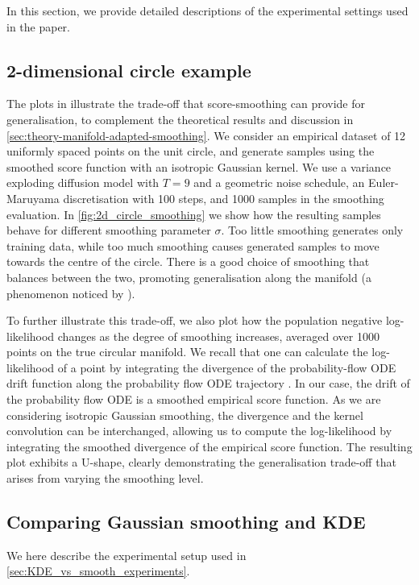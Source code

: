 \documentclass[10pt]{article}
\theoremstyle{plain}
\theoremstyle{definition}
\theoremstyle{remark}
\begin{document}
In this section, we provide detailed descriptions of the experimental settings used in the paper.

\subsection{2-dimensional circle example}\label{app:circle_details}

The plots in  illustrate the trade-off that score-smoothing can provide for generalisation, to complement the theoretical results and discussion in \cref{sec:theory-manifold-adapted-smoothing}. We consider an empirical dataset of 12 uniformly spaced points on the unit circle, and generate samples using the smoothed score function with an isotropic Gaussian kernel. We use a variance exploding diffusion model with $T=9$ and a geometric noise schedule, an Euler-Maruyama discretisation with 100 steps, and 1000 samples in the smoothing evaluation. In \cref{fig:2d_circle_smoothing} we show how the resulting samples behave for different smoothing parameter $\sigma$. Too little smoothing generates only training data, while too much smoothing causes generated samples to move towards the centre of the circle. There is a good choice of smoothing that balances between the two, promoting generalisation along the manifold (a phenomenon noticed by \citet{scarvelis2023closedformdiffusionmodels}).

To further illustrate this trade-off, we also plot how the population negative log-likelihood changes as the degree of smoothing increases, averaged over 1000 points on the true circular manifold. We recall that one can calculate the log-likelihood of a point by integrating the divergence of the probability-flow ODE drift function along the probability flow ODE trajectory \citep{chen18_neuralodes}. In our case, the drift of the probability flow ODE is a smoothed empirical score function.
As we are considering isotropic Gaussian smoothing, the divergence and the kernel convolution can be interchanged, allowing us to compute the log-likelihood by integrating the smoothed divergence of the empirical score function. The resulting plot exhibits a U-shape, clearly demonstrating the generalisation trade-off that arises from varying the smoothing level.






\subsection{Comparing Gaussian smoothing and KDE}
\label{app:KDE_vs_smooth_experiments}
We here describe the experimental setup used in \cref{sec:KDE_vs_smooth_experiments}.
\end{document}
